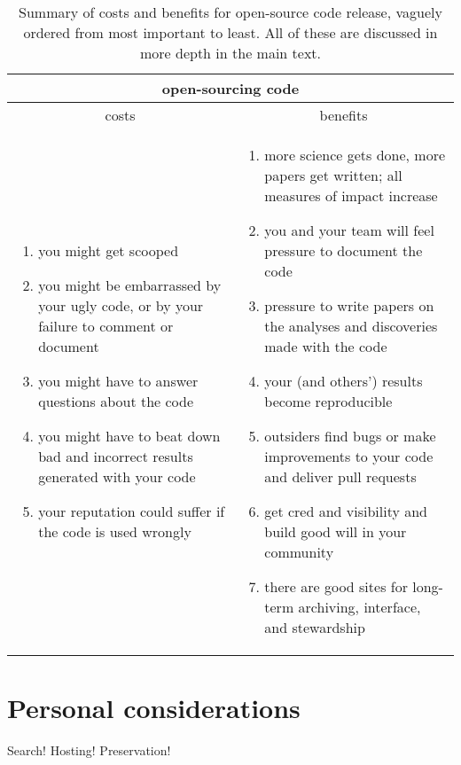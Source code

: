 \documentclass[12pt,twoside,pdftex]{article}
\begin{document}
\begin{table}%
\begin{tabular}{@{}p{\cwidth}|p{\cwidth}@{}}%
\multicolumn{2}{c}{\textbf{open-sourcing code}} \\ \hline
\multicolumn{1}{c|}{costs} & \multicolumn{1}{c}{benefits} \\ \hline
\begin{enumerate}\raggedright
\item you might get scooped
\item you might be embarrassed by your ugly code, or by your failure to comment or document
\item you might have to answer questions about the code
\item you might have to beat down bad and incorrect results generated with your code
\item your reputation could suffer if the code is used wrongly
\end{enumerate}&\begin{enumerate}\raggedright
\item more science gets done, more papers get written; all measures of impact increase
\item you and your team will feel pressure to document the code
\item pressure to write papers on the analyses and discoveries made with the code
\item your (and others') results become reproducible
\item outsiders find bugs or make improvements to your code and deliver pull requests
\item get cred and visibility and build good will in your community
\item there are good sites for long-term archiving, interface, and stewardship
\end{enumerate}\end{tabular}
\caption{Summary of costs and benefits for open-source code release,
  vaguely ordered from most important to least. All of these are
  discussed in more depth in the main text.\label{tab:code}}
\end{table}

\section{Personal considerations}

Search! Hosting! Preservation!
\end{document}
